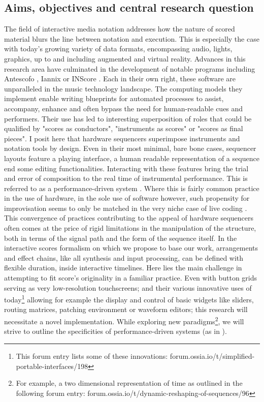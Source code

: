 \documentclass[journal,onecolumn]{IEEEtran}
\begin{document}
\subsection{Aims, objectives and central research question}
The field of interactive media notation addresses how the nature of scored material blurs the line between notation and execution. This is especially the case with today's growing variety of data formats, encompassing audio, lights, graphics, up to and including augmented and virtual reality. 
Advances in this research area have culminated in the development of notable programs including Antescofo \cite{ircam:antescofo}, Iannix \cite{buzzing:iannix} or INScore \cite{grame:inscore}.
Each in their own right, these software are unparalleled in the music technology landscape. The computing models they implement enable writing blueprints for automated processes to assist, accompany, enhance and often bypass the need for human-readable cues and performers. Their use has led to interesting superposition of roles that could be qualified by "scores as conductors", "instruments as scores" or "scores as final pieces". I posit here that hardware sequencers superimpose instruments and notation tools by design. Even in their most minimal, bare bone cases, sequencer layouts feature a playing interface, a human readable representation of a sequence end some editing functionalities.
Interacting with these features bring the trial and error of composition to the real time of instrumental performance. This is referred to as a performance-driven system \cite{nash:liveness}. Where this is fairly common practice in the use of hardware, in the sole use of software however, such propensity for improvisation seems to only be matched in the very niche case of live coding \cite{blackwell:livecoding}.
This convergence of practices contributing to the appeal of hardware sequencers often comes at the price of rigid limitations in the manipulation of the structure, both in terms of the signal path and the form of the sequence itself.
In the interactive scores formalism on which we propose to base our work, arrangements and effect chains, like all synthesis and input processing, can be defined with flexible duration, inside interactive timelines. Here lies the main challenge in attempting to fit score's originality in a familiar practice. Even with button grids serving as very low-resolution touchscreens;
and their various innovative uses of today\footnote{This forum entry lists some of these innovations: forum.ossia.io/t/simplified-portable-interfaces/198} allowing for example the display and control of basic widgets like sliders, routing matrices, patching environment or waveform editors; this research will necessitate a novel implementation. While exploring new paradigms\footnote{For example, a two dimensional representation of time as outlined in the following forum entry: forum.ossia.io/t/dynamic-reshaping-of-sequences/96}, we will strive to outline the specificities of performance-driven systems (as in \cite{nash:liveness}).
\end{document}
